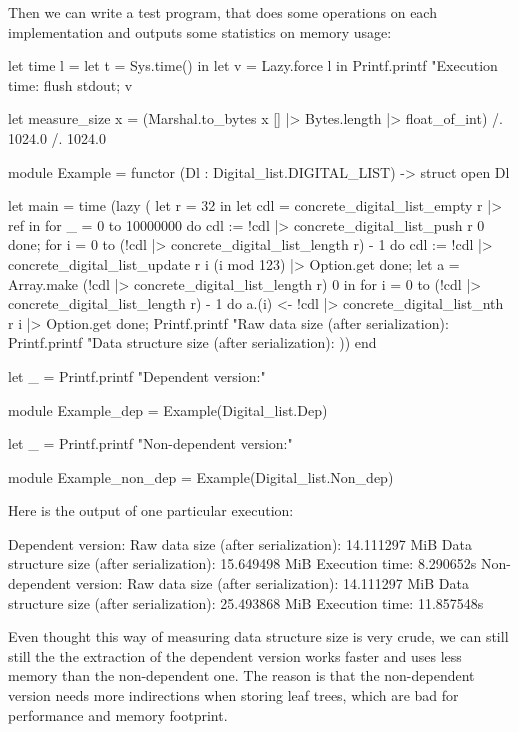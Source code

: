 \documentclass{article}
\begin{document}
Then we can write a test program, that does some operations on each implementation and outputs some statistics on memory usage:

\begin{coq}
let time l =
  let t = Sys.time() in
  let v = Lazy.force l in
  Printf.printf "Execution time: %
  flush stdout;
  v

let measure_size x = (Marshal.to_bytes x [] |> Bytes.length |> float_of_int) /. 1024.0 /. 1024.0

module Example = functor (Dl : Digital_list.DIGITAL_LIST) -> struct
  open Dl

  let main =
    time (lazy (
      let r = 32 in
      let cdl = concrete_digital_list_empty r |> ref in
      for _ = 0 to 10000000 do
        cdl := !cdl |> concrete_digital_list_push r 0
      done;
      for i = 0 to (!cdl |> concrete_digital_list_length r) - 1 do
        cdl := !cdl |> concrete_digital_list_update r i (i mod 123) |> Option.get
      done;
      let a = Array.make (!cdl |> concrete_digital_list_length r) 0 in
      for i = 0 to (!cdl |> concrete_digital_list_length r) - 1 do
        a.(i) <- !cdl |> concrete_digital_list_nth r i |> Option.get
      done;
      Printf.printf "Raw data size (after serialization): %
      Printf.printf "Data structure size (after serialization): %
    ))
end

let _ = Printf.printf "Dependent version:\n"

module Example_dep = Example(Digital_list.Dep)

let _ = Printf.printf "Non-dependent version:\n"

module Example_non_dep = Example(Digital_list.Non_dep)
\end{coq}

Here is the output of one particular execution:

\begin{coq}
Dependent version:
Raw data size (after serialization): 14.111297 MiB
Data structure size (after serialization): 15.649498 MiB
Execution time: 8.290652s
Non-dependent version:
Raw data size (after serialization): 14.111297 MiB
Data structure size (after serialization): 25.493868 MiB
Execution time: 11.857548s
\end{coq}

Even thought this way of measuring data structure size is very crude, we can still still the the extraction of the dependent version works faster and uses less memory than the non-dependent one. The reason is that the non-dependent version needs more indirections when storing leaf trees, which are bad for performance and memory footprint.
\end{document}
